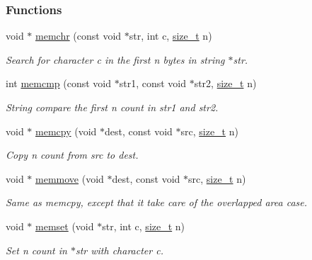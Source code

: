 \subsubsection*{Functions}
\begin{DoxyCompactItemize}
\item 
void $\ast$ \mbox{\hyperlink{a00074_af2c756015b1cb92274fc019a175ae8bb}{memchr}} (const void $\ast$str, int c, \mbox{\hyperlink{a00074_a43b4547e12226fef871eed8afe191ad7}{size\+\_\+t}} n)
\begin{DoxyCompactList}\small\item\em Search for character c in the first n bytes in string $\ast$str. \end{DoxyCompactList}\item 
int \mbox{\hyperlink{a00074_ace6c4869ab3af01c6f27eac47773917a}{memcmp}} (const void $\ast$str1, const void $\ast$str2, \mbox{\hyperlink{a00074_a43b4547e12226fef871eed8afe191ad7}{size\+\_\+t}} n)
\begin{DoxyCompactList}\small\item\em String compare the first n count in str1 and str2. \end{DoxyCompactList}\item 
void $\ast$ \mbox{\hyperlink{a00074_a14938524dcbeb59d7117ba5e151ad1b1}{memcpy}} (void $\ast$dest, const void $\ast$src, \mbox{\hyperlink{a00074_a43b4547e12226fef871eed8afe191ad7}{size\+\_\+t}} n)
\begin{DoxyCompactList}\small\item\em Copy n count from src to dest. \end{DoxyCompactList}\item 
void $\ast$ \mbox{\hyperlink{a00074_a802c986820d3866639922b6bc9484f90}{memmove}} (void $\ast$dest, const void $\ast$src, \mbox{\hyperlink{a00074_a43b4547e12226fef871eed8afe191ad7}{size\+\_\+t}} n)
\begin{DoxyCompactList}\small\item\em Same as memcpy, except that it take care of the overlapped area case. \end{DoxyCompactList}\item 
void $\ast$ \mbox{\hyperlink{a00074_a48a16bf628904bdd1b28cbaedf934868}{memset}} (void $\ast$str, int c, \mbox{\hyperlink{a00074_a43b4547e12226fef871eed8afe191ad7}{size\+\_\+t}} n)
\begin{DoxyCompactList}\small\item\em Set n count in $\ast$str with character c. \end{DoxyCompactList}\item 

\end{DoxyCompactItemize}
